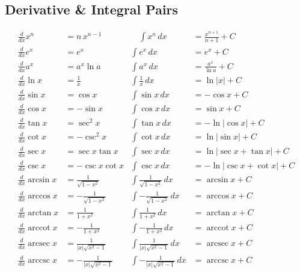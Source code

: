 \documentclass{article}
\begin{document}
\begin{multicols}{2}

\section*{Derivative \& Integral Pairs}

\begin{align*}
\frac{d}{dx}x^n &= n\,x^{n-1}
&\quad
\int x^n\,dx &= \frac{x^{n+1}}{n+1}+C
\\[6pt]
\frac{d}{dx}e^x &= e^x
&
\int e^x\,dx &= e^x + C
\\[6pt]
\frac{d}{dx}a^x &= a^x\ln a
&
\int a^x\,dx &= \frac{a^x}{\ln a}+C
\\[6pt]
\frac{d}{dx}\ln x &= \tfrac1x
&
\int \tfrac{1}{x}\,dx &= \ln|x|+C
\\[6pt]
\frac{d}{dx}\sin x &= \cos x
&
\int \sin x\,dx &= -\cos x + C
\\[6pt]
\frac{d}{dx}\cos x &= -\sin x
&
\int \cos x\,dx &= \sin x + C
\\[6pt]
\frac{d}{dx}\tan x &= \sec^2 x
&
\int \tan x\,dx &= -\ln\lvert\cos x\rvert + C
\\[6pt]
\frac{d}{dx}\cot x &= -\csc^2 x
&
\int \cot x\,dx &= \ln\lvert\sin x\rvert + C
\\[6pt]
\frac{d}{dx}\sec x &= \sec x\tan x
&
\int \sec x\,dx &= \ln\lvert\sec x+\tan x\rvert + C
\\[6pt]
\frac{d}{dx}\csc x &= -\csc x\cot x
&
\int \csc x\,dx &= -\ln\lvert\csc x+\cot x\rvert + C
\\[10pt]
\frac{d}{dx}\arcsin x &= \frac{1}{\sqrt{1-x^2}}
&
\int \frac{1}{\sqrt{1-x^2}}\,dx &= \arcsin x + C
\\[6pt]
\frac{d}{dx}\arccos x &= -\frac{1}{\sqrt{1-x^2}}
&
\int -\frac{1}{\sqrt{1-x^2}}\,dx &= \arccos x + C
\\[6pt]
\frac{d}{dx}\arctan x &= \frac{1}{1+x^2}
&
\int \frac{1}{1+x^2}\,dx &= \arctan x + C
\\[6pt]
\frac{d}{dx}\operatorname{arccot} x &= -\frac{1}{1+x^2}
&
\int -\frac{1}{1+x^2}\,dx &= \operatorname{arccot} x + C
\\[6pt]
\frac{d}{dx}\operatorname{arcsec} x &= \frac{1}{|x|\sqrt{x^2-1}}
&
\int \frac{1}{|x|\sqrt{x^2-1}}\,dx &= \operatorname{arcsec} x + C
\\[6pt]
\frac{d}{dx}\operatorname{arccsc} x &= -\frac{1}{|x|\sqrt{x^2-1}}
&
\int -\frac{1}{|x|\sqrt{x^2-1}}\,dx &= \operatorname{arccsc} x + C
\end{align*}

\end{multicols}
\end{document}
